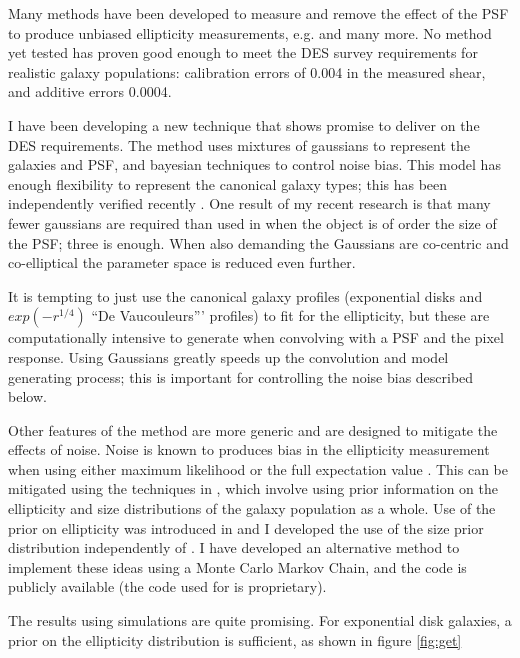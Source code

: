 \documentclass[12pt]{article}
\newcommand{\devauc}{De Vaucouleurs'}
\begin{document}
Many methods have been developed to measure and remove the effect of the PSF to
produce unbiased ellipticity measurements, e.g.
\cite{ksb95,Bern02,Miller07,Melchior11} and many more.  No method yet tested
has proven good enough to meet the DES survey requirements for realistic galaxy
populations:  calibration errors of 0.004 in the measured shear, and additive
errors 0.0004.

I have been developing a new technique that shows promise to deliver on the DES
requirements.  The method uses mixtures of gaussians to represent the galaxies
and PSF, and bayesian techniques to control noise bias.  This model has enough
flexibility to represent the canonical galaxy types; this has been
independently verified recently \citep{HoggGMix12}.  One result of my recent
research is that many fewer gaussians are required than used in
\cite{HoggGMix12} when the object is of order the size of the PSF; three is
enough.  When also demanding the Gaussians are co-centric and co-elliptical the
parameter space is reduced even further.  

It is tempting to just use the canonical galaxy profiles (exponential disks and
$exp(-r^{1/4})$ ``\devauc'' profiles) to fit for the ellipticity, but these are
computationally intensive to generate when convolving with a PSF and the pixel
response.  Using Gaussians greatly speeds up the convolution and model
generating process; this is important for controlling the noise bias described
below.

Other features of the method are more generic and are designed to mitigate the
effects of noise.  Noise is known to produces bias in the ellipticity
measurement when using either maximum likelihood \cite{Refreg12} or the full
expectation value \cite{Miller12}.  This can be mitigated using the techniques
in \cite{Miller07,Miller12}, which involve using prior information on the
ellipticity and size distributions of the galaxy population as a whole.  Use of
the prior on ellipticity was introduced in \cite{Miller07} and I developed the
use of the size prior distribution independently of \cite{Miller12}.  I have
developed an alternative method to implement these ideas using a Monte Carlo
Markov Chain, and the code is publicly available (the code used for \cite{Miller07}
is proprietary).

The results using simulations are quite promising.  For exponential disk galaxies,
a prior on the ellipticity distribution is sufficient, as shown in figure \ref{fig:get}
\end{document}
